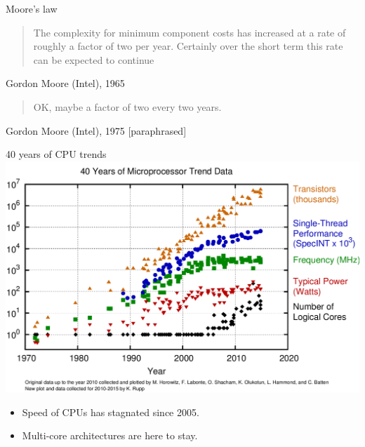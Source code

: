\documentclass[10pt]{beamer}
\begin{document}
\begin{frame}{Moore's law}
\begin{quote}
The complexity for minimum component costs 
has increased at a rate of roughly a factor of 
two per year. Certainly over the short term this 
rate can be expected to continue
\end{quote}
Gordon Moore (Intel), 1965

\hspace{1em}\begin{quote}
OK, maybe a factor of two every two 
years.
\end{quote}
Gordon Moore (Intel), 1975 [paraphrased]
\end{frame}


\begin{frame}{40 years of CPU trends}
\vspace{1em}
\centering\includegraphics[width=0.8\linewidth]{img/moore_law}

\begin{itemize}[<+->]
\item Speed of CPUs has stagnated since 2005.
\item Multi-core architectures are here to stay.
\end{itemize}
\end{frame}


% 
\end{document}
